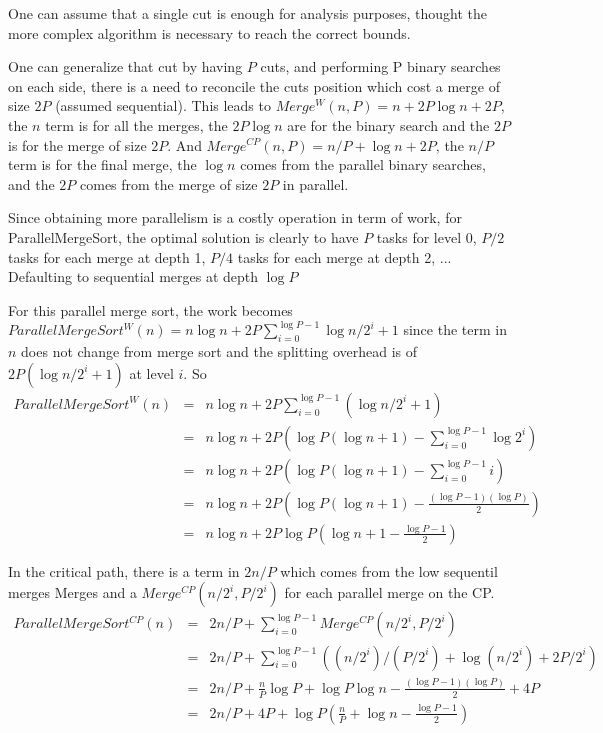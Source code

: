\documentclass{article}
\begin{document}
One can assume that a single cut is enough for analysis purposes,
thought the more complex algorithm is necessary to reach the correct
bounds.

One can generalize that cut by having $P$ cuts, and performing P
binary searches on each side, there is a need to reconcile the cuts
position which cost a merge of size $2P$ (assumed sequential). This leads to $Merge^W(n,P) =
n + 2 P \log n + 2P$, the $n$ term is for all the merges, the $2P \log
n$ are for the binary search and the $2P$ is for the merge of size
$2P$. And $Merge^{CP}(n,P) = n/P + \log n + 2P$, the $n/P$ term
is for the final merge, the $\log n$ comes from the parallel binary
searches, and the $2P$ comes from the merge of size $2P$ in parallel.

Since obtaining more parallelism is a costly operation in term of
work, for ParallelMergeSort, the optimal solution is clearly to have
$P$ tasks for level 0, $P/2$ tasks for each merge at depth 1,
$P/4$ tasks for each merge at depth 2, ... Defaulting to sequential
merges at depth $\log P$

For this parallel merge sort, the work becomes
$ParallelMergeSort^W(n) = n \log n + 2 P \sum_{i=0}^{\log P - 1} \log n/2^i + 1$
since the term in $n$ does not change
from merge sort and the splitting overhead is of $2P (\log n/2^i + 1)$ at
level $i$. So
\begin{align}
  ParallelMergeSort^W(n) & = & n \log n + 2 P \sum_{i=0}^{\log P - 1}( \log n/2^i + 1  )\\
  & = &n \log n + 2 P \left (\log P (\log n +1)- \sum_{i=0}^{\log P - 1} \log 2^i  \right )  \\
  & = &n \log n + 2 P \left (\log P (\log n +1)- \sum_{i=0}^{\log P - 1} i \right )  \\
  & = &n \log n + 2 P \left ( \log P (\log n +1)- \frac{(\log P - 1)(\log P)}{2}   \right) \\
  & = &n \log n + 2 P \log P \left (  \log n + 1 - \frac{\log P - 1}{2}   \right)  
\end{align}

In the critical path, there is a term in $2 n/P$ which comes from the
low sequentil merges Merges and a $Merge^{CP}(n/2^i,P/2^i)$ for each
parallel merge on the CP.
\begin{align}
  ParallelMergeSort^{CP}(n) & = & 2n/P + \sum_{i=0}^{\log P-1} Merge^{CP}(n/2^i,P/2^i) \\
  & = & 2n/P + \sum_{i=0}^{\log P-1} \left ( (n/2^i)/(P/2^i) + \log (n/2^i) + 2P/2^i \right )\\
  & = & 2n/P + \frac{n}{P} \log P  + \log P \log n - \frac{(\log P - 1)(\log P)}{2}  + 4P \\
  & = & 2n/P + 4P + \log P \left ( \frac{n}{P}   +  \log n - \frac{\log P - 1}{2}  \right )
\end{align}
\end{document}
